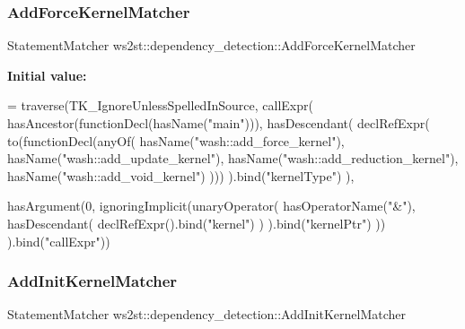 \mbox{\label{namespacews2st_1_1dependency__detection_a2e41b3265e8d011f4c0834b0b6d924ee}} 
\subsubsection{\texorpdfstring{Add\+Force\+Kernel\+Matcher}{AddForceKernelMatcher}}
{\footnotesize\ttfamily Statement\+Matcher ws2st\+::dependency\+\_\+detection\+::\+Add\+Force\+Kernel\+Matcher}

{\bfseries Initial value\+:}
\begin{DoxyCode}
= traverse(TK\_IgnoreUnlessSpelledInSource, callExpr(
        hasAncestor(functionDecl(hasName(\textcolor{stringliteral}{"main"}))),
        hasDescendant(
            declRefExpr(
                to(functionDecl(anyOf(
                    hasName(\textcolor{stringliteral}{"wash::add\_force\_kernel"}),
                    hasName(\textcolor{stringliteral}{"wash::add\_update\_kernel"}),
                    hasName(\textcolor{stringliteral}{"wash::add\_reduction\_kernel"}),
                    hasName(\textcolor{stringliteral}{"wash::add\_void\_kernel"})
                )))
            ).bind(\textcolor{stringliteral}{"kernelType"})
        ),
        
        hasArgument(0, ignoringImplicit(unaryOperator(
            hasOperatorName(\textcolor{stringliteral}{"&"}),
            hasDescendant(
                declRefExpr().bind(\textcolor{stringliteral}{"kernel"})
            )
        ).bind(\textcolor{stringliteral}{"kernelPtr"}) ))
    ).bind(\textcolor{stringliteral}{"callExpr"}))
\end{DoxyCode}
\mbox{\label{namespacews2st_1_1dependency__detection_a243f082eabf51fdabcc2a5e92659c242}} 
\subsubsection{\texorpdfstring{Add\+Init\+Kernel\+Matcher}{AddInitKernelMatcher}}
{\footnotesize\ttfamily Statement\+Matcher ws2st\+::dependency\+\_\+detection\+::\+Add\+Init\+Kernel\+Matcher}

